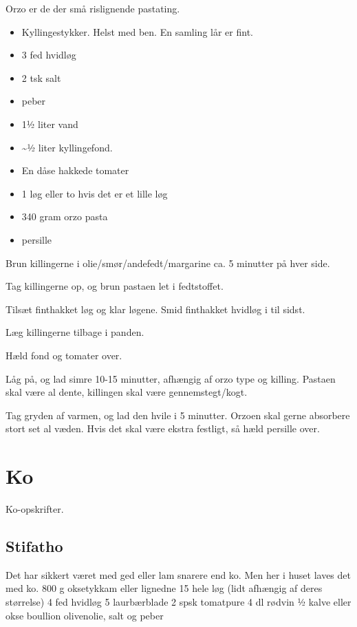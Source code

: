 \documentclass[
]{book}
\providecommand{\tightlist}{%
  \setlength{\itemsep}{0pt}\setlength{\parskip}{0pt}}
\begin{document}
Orzo er de der små rislignende pastating.

\begin{itemize}
\tightlist
\item
  Kyllingestykker. Helst med ben. En samling lår er fint.
\item
  3 fed hvidløg
\item
  2 tsk salt
\item
  peber
\item
  1½ liter vand
\item
  \textasciitilde½ liter kyllingefond.
\item
  En dåse hakkede tomater
\item
  1 løg eller to hvis det er et lille løg
\item
  340 gram orzo pasta
\item
  persille
\end{itemize}

Brun killingerne i olie/smør/andefedt/margarine
ca. 5 minutter på hver side.

Tag killingerne op, og brun pastaen let i fedtstoffet.

Tilsæt finthakket løg og klar løgene. Smid finthakket hvidløg i til sidst.

Læg killingerne tilbage i panden.

Hæld fond og tomater over.

Låg på, og lad simre 10-15 minutter, afhængig af orzo type og killing.
Pastaen skal være al dente, killingen skal være gennemstegt/kogt.

Tag gryden af varmen, og lad den hvile i 5 minutter. Orzoen skal gerne absorbere
stort set al væden. Hvis det skal være ekstra festligt, så hæld persille over.

\hypertarget{ko}{%
\chapter{Ko}\label{ko}}

Ko-opskrifter.

\hypertarget{stifatho}{%
\section{Stifatho}\label{stifatho}}

Det har sikkert været med ged eller lam snarere end ko. Men her i huset laves det med ko.
800 g oksetykkam eller lignedne
15 hele løg (lidt afhængig af deres størrelse)
4 fed hvidløg
5 laurbærblade
2 spsk tomatpure
4 dl rødvin
½ kalve eller okse boullion
olivenolie, salt og peber
\end{document}
